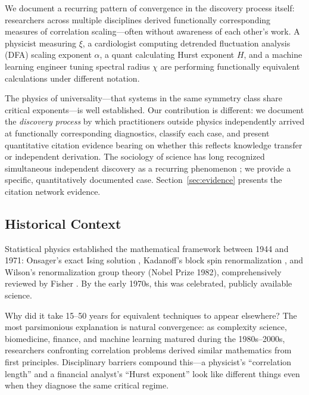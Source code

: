 \documentclass[11pt]{article}
\begin{document}
We document a recurring pattern of convergence in the discovery process itself: researchers across multiple disciplines derived functionally corresponding measures of correlation scaling---often without awareness of each other's work. A physicist measuring $\xi$, a cardiologist computing detrended fluctuation analysis (DFA) scaling exponent $\alpha$, a quant calculating Hurst exponent $H$, and a machine learning engineer tuning spectral radius $\chi$ are performing functionally equivalent calculations under different notation.

The physics of universality---that systems in the same symmetry class share critical exponents---is well established. Our contribution is different: we document the \textit{discovery process} by which practitioners outside physics independently arrived at functionally corresponding diagnostics, classify each case, and present quantitative citation evidence bearing on whether this reflects knowledge transfer or independent derivation. The sociology of science has long recognized simultaneous independent discovery as a recurring phenomenon \citep{merton1961}; we provide a specific, quantitatively documented case. Section~\ref{sec:evidence} presents the citation network evidence.

\subsection{Historical Context}

Statistical physics established the mathematical framework between 1944 and 1971: Onsager's exact Ising solution \citep{onsager1944}, Kadanoff's block spin renormalization \citep{kadanoff1966}, and Wilson's renormalization group theory \citep{wilson1971} (Nobel Prize 1982), comprehensively reviewed by Fisher \citep{fisher1974}. By the early 1970s, this was celebrated, publicly available science.

Why did it take 15--50 years for equivalent techniques to appear elsewhere? The most parsimonious explanation is natural convergence: as complexity science, biomedicine, finance, and machine learning matured during the 1980s--2000s, researchers confronting correlation problems derived similar mathematics from first principles. Disciplinary barriers compound this---a physicist's ``correlation length'' and a financial analyst's ``Hurst exponent'' look like different things even when they diagnose the same critical regime.
\end{document}
